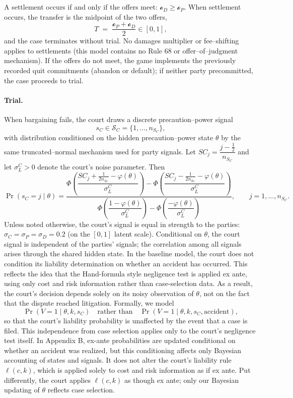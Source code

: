 \documentclass{article}
\begin{document}
A settlement occurs if and only if the offers meet: $\mathcal{o}_D\ge \mathcal{o}_P$. When settlement occurs, the transfer is the midpoint of the two offers,
\[
T \;=\; \frac{\mathcal{o}_P+\mathcal{o}_D}{2}\in[0,1],
\]
and the case terminates without trial. No damages multiplier or fee–shifting applies to settlements (this model contains no Rule 68 or offer–of–judgment mechanism). If the offers do not meet, the game implements the previously recorded quit commitments (abandon or default); if neither party precommitted, the case proceeds to trial.

\paragraph{Trial.}
When bargaining fails, the court draws a discrete precaution–power signal
\[
s_C \in \mathcal{S}_C=\{1,\dots,n_{S_C}\},
\]
with distribution conditioned on the hidden precaution–power state $\theta$ by the same truncated–normal mechanism used for party signals. Let $SC_j=\dfrac{j-\tfrac12}{n_{S_C}}$ and let $\sigma_L^{C}>0$ denote the court’s noise parameter. Then
\[
\Pr(s_C=j\mid \theta)
=
\frac{
\Phi\!\left(\dfrac{SC_j+\tfrac{1}{2n_{S_C}}-\varphi(\theta)}{\sigma_L^{C}}\right)
-
\Phi\!\left(\dfrac{SC_j-\tfrac{1}{2n_{S_C}}-\varphi(\theta)}{\sigma_L^{C}}\right)
}{
\Phi\!\left(\dfrac{1-\varphi(\theta)}{\sigma_L^{C}}\right)
-
\Phi\!\left(\dfrac{-\varphi(\theta)}{\sigma_L^{C}}\right)
},
\qquad j=1,\dots,n_{S_C}.
\]
Unless noted otherwise, the court's signal is equal in strength to the parties: $\sigma_C = \sigma_P = \sigma_D= 0.2$ (on the $[0,1]$ latent scale). Conditional on $\theta$, the court signal is independent of the parties’ signals; the correlation among all signals arises through the shared hidden state. In the baseline model, the court does not condition its liability determination on whether an accident has occurred. This reflects the idea that the Hand-formula style negligence test is applied ex ante, using only cost and risk information rather than case-selection data. As a result, the court’s decision depends solely on its noisy observation of $\theta$, not on the fact that the dispute reached litigation. Formally, we model
\[
\Pr(V=1 \mid \theta,k,s_C) \quad \text{rather than} \quad \Pr(V=1 \mid \theta,k,s_C,\text{accident}),
\]
so that the court’s liability probability is unaffected by the event that a case is filed. This independence from case selection applies only to the court’s negligence test itself. In Appendix B, ex-ante probabilities are updated conditional on whether an accident was realized, but this conditioning affects only Bayesian accounting of states and signals. It does not alter the court’s liability rule $\ell(c,k)$, which is applied solely to cost and risk information as if ex ante. Put differently, the court applies $\ell(c,k)$ as though ex ante; only our Bayesian updating of $\theta$ reflects case selection.
\end{document}
